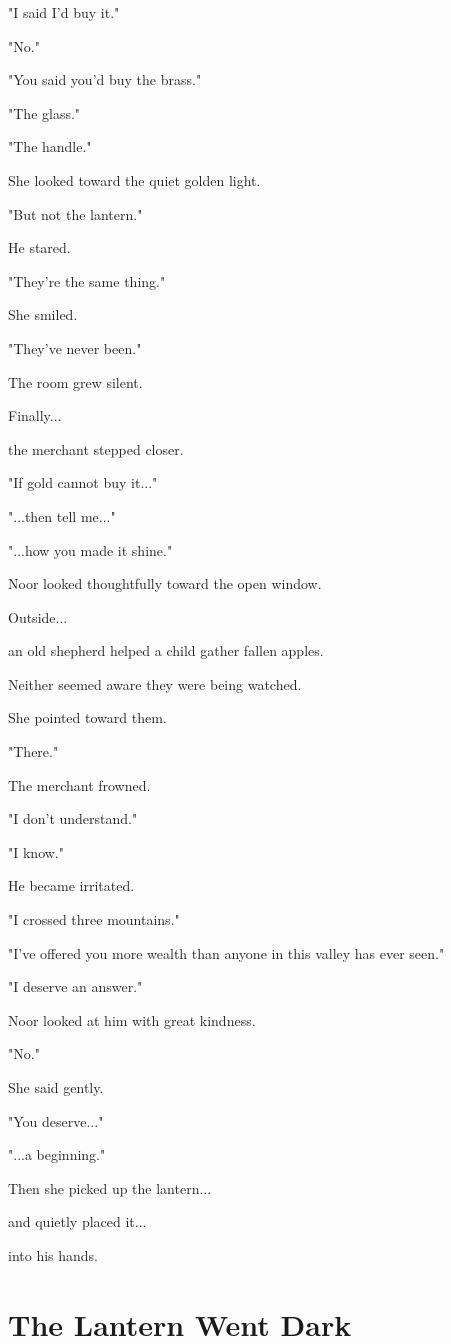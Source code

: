 \documentclass[12pt,openany]{book}
\begin{document}
"I said I'd buy it."

"No."

"You said you'd buy the brass."

"The glass."

"The handle."

She looked toward the quiet golden light.

"But not the lantern."

He stared.

"They're the same thing."

She smiled.

"They've never been."

The room grew silent.

Finally...

the merchant stepped closer.

"If gold cannot buy it..."

"...then tell me..."

"...how you made it shine."

Noor looked thoughtfully toward the open window.

Outside...

an old shepherd helped a child gather fallen apples.

Neither seemed aware they were being watched.

She pointed toward them.

"There."

The merchant frowned.

"I don't understand."

"I know."

He became irritated.

"I crossed three mountains."

"I've offered you more wealth than anyone in this valley has ever seen."

"I deserve an answer."

Noor looked at him with great kindness.

"No."

She said gently.

"You deserve..."

"...a beginning."

Then she picked up the lantern...

and quietly placed it...

into his hands.
\section*{The Lantern Went Dark}
\end{document}
